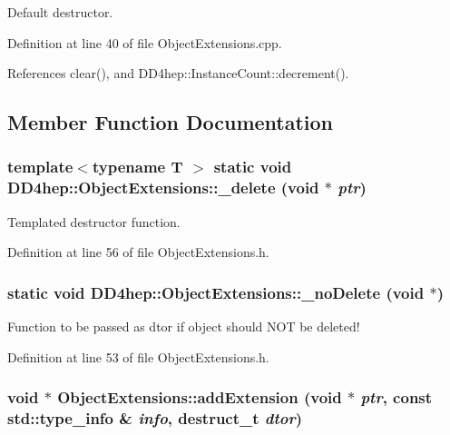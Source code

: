 Default destructor. 

Definition at line 40 of file ObjectExtensions.cpp.

References clear(), and DD4hep::InstanceCount::decrement().

\subsection{Member Function Documentation}
\hypertarget{class_d_d4hep_1_1_object_extensions_a558f472ce5f48a832f121a2313cbc70e}{
\subsubsection[{\_\-delete}]{\setlength{\rightskip}{0pt plus 5cm}template$<$typename T $>$ static void DD4hep::ObjectExtensions::\_\-delete (void $\ast$ {\em ptr})}}
\label{class_d_d4hep_1_1_object_extensions_a558f472ce5f48a832f121a2313cbc70e}


Templated destructor function. 

Definition at line 56 of file ObjectExtensions.h.\hypertarget{class_d_d4hep_1_1_object_extensions_a0c32fb2af89407102b494ab9c15f9eac}{
\subsubsection[{\_\-noDelete}]{\setlength{\rightskip}{0pt plus 5cm}static void DD4hep::ObjectExtensions::\_\-noDelete (void $\ast$)}}
\label{class_d_d4hep_1_1_object_extensions_a0c32fb2af89407102b494ab9c15f9eac}


Function to be passed as dtor if object should NOT be deleted! 

Definition at line 53 of file ObjectExtensions.h.\hypertarget{class_d_d4hep_1_1_object_extensions_a9e4010c2b9cbfda1455c10821a3cae85}{
\subsubsection[{addExtension}]{\setlength{\rightskip}{0pt plus 5cm}void $\ast$ ObjectExtensions::addExtension (void $\ast$ {\em ptr}, \/  const std::type\_\-info \& {\em info}, \/  {\bf destruct\_\-t} {\em dtor})}}
\label{class_d_d4hep_1_1_object_extensions_a9e4010c2b9cbfda1455c10821a3cae85}


